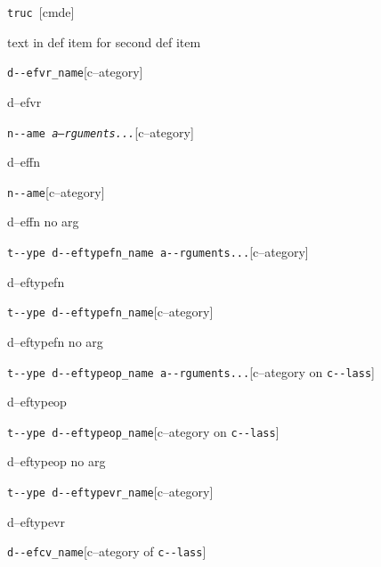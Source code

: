 \documentclass{book}
\begin{document}
\begin{titlepage}
%
\noindent\texttt{truc \EmbracOn{}\textnormal{\textsl{}}\EmbracOff{}}\hfill[cmde]



%
text in def item for second def item


\noindent\texttt{d{-}{-}efvr\_name}\hfill[c--ategory]



%
d--efvr

\noindent\texttt{n{-}{-}ame \EmbracOn{}\textnormal{\textsl{a--rguments...}}\EmbracOff{}}\hfill[c--ategory]



%
d--effn

\noindent\texttt{n{-}{-}ame}\hfill[c--ategory]



%
d--effn no arg

\noindent\texttt{t{-}{-}ype d{-}{-}eftypefn\_name a{-}{-}rguments...}\hfill[c--ategory]



%
d--eftypefn

\noindent\texttt{t{-}{-}ype d{-}{-}eftypefn\_name}\hfill[c--ategory]



%
d--eftypefn no arg

\noindent\texttt{t{-}{-}ype d{-}{-}eftypeop\_name a{-}{-}rguments...}\hfill[c--ategory on \texttt{c{-}{-}lass}]



%
d--eftypeop

\noindent\texttt{t{-}{-}ype d{-}{-}eftypeop\_name}\hfill[c--ategory on \texttt{c{-}{-}lass}]



%
d--eftypeop no arg

\noindent\texttt{t{-}{-}ype d{-}{-}eftypevr\_name}\hfill[c--ategory]



%
d--eftypevr

\noindent\texttt{d{-}{-}efcv\_name}\hfill[c--ategory of \texttt{c{-}{-}lass}]




\end{titlepage}
\end{document}

